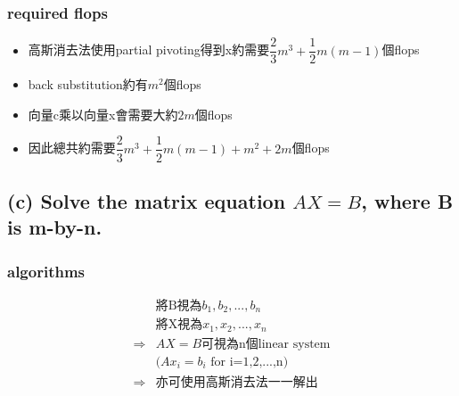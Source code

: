 \documentclass[12pt]{article}
\begin{document}
            \subsubsection*{required flops}
                \begin{itemize}
                    \item 高斯消去法使用partial pivoting得到x約需要$\dfrac{2}{3}m^3+\dfrac{1}{2}m(m-1)$個flops
                    \item back substitution約有$m^2$個flops
                    \item 向量c乘以向量x會需要大約$2m$個flops
                    \item 因此總共約需要$\dfrac{2}{3}m^3+\dfrac{1}{2}m(m-1)+m^2+2m$個flops
                \end{itemize}
        \subsection*{(c) Solve the matrix equation $AX = B$, where B is m-by-n.}
            \subsubsection*{algorithms}
                \begin{equation*}
                    \begin{aligned}
                        &\text{將B視為$b_1,b_2,...,b_n$}\\
                        &\text{將X視為$x_1,x_2,...,x_n$}\\
                        \Rightarrow &\text{$AX=B$可視為n個linear system}\\
                        &\text{($Ax_i=b_i$ for i=1,2,...,n)}\\
                        \Rightarrow &\text{亦可使用高斯消去法一一解出}\\
                    \end{aligned}    
                \end{equation*}
\end{document}
